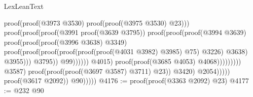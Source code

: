 \begin{lexlean}{LexLeanText}
\begin{coremodule}
                                                                            proof(proof(@3973 @3530)
                                                                                proof(proof(@3975
                                                                                      @3530)
                                                                                    @23)))
                                                                          proof(proof(proof(@3991
                                                                                  proof(@3639
                                                                                      @3795))
                                                                                proof(proof(proof(@3994
                                                                                        @3639)
                                                                                      proof(proof(proof(@3996
                                                                                              @3638)
                                                                                            @3349)
                                                                                          proof(proof(proof(proof(proof(proof(@4031
                                                                                                        @3982)
                                                                                                      @3985)
                                                                                                    @75)
                                                                                                  @3226)
                                                                                                @3638)
                                                                                              @3955)))
                                                                                    @3795))
                                                                              @99))))))
                                                            @4015)
                                                          proof(proof(@3685 @4053) @4068)))))))))
                                    @3587)
                                  proof(proof(proof(@3697 @3587) @3711) @23))
                                @3420)
                              @2054)))))
                  proof(@3617 @2092))
                @90)))))
@4176 := proof(proof(@3363 @2092) @23)
@4177 := @232 @90

\end{coremodule}
\end{lexlean}
